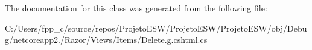 The documentation for this class was generated from the following file\+:\begin{DoxyCompactItemize}
\item 
C\+:/\+Users/fpp\+\_\+c/source/repos/\+Projeto\+E\+S\+W/\+Projeto\+E\+S\+W/\+Projeto\+E\+S\+W/obj/\+Debug/netcoreapp2./\+Razor/\+Views/\+Items/Delete.\+g.\+cshtml.\+cs\end{DoxyCompactItemize}
